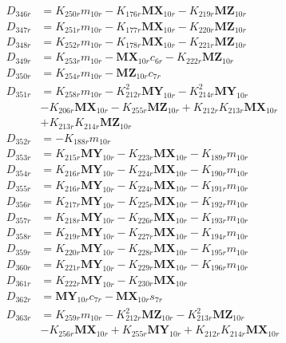 \begin{align}
D_{346r} &= K_{250r}m_{10r} - K_{176r}\mathbf{MX}_{10r} - K_{219r}\mathbf{MZ}_{10r} \nonumber \\
D_{347r} &= K_{251r}m_{10r} - K_{177r}\mathbf{MX}_{10r} - K_{220r}\mathbf{MZ}_{10r} \nonumber \\
D_{348r} &= K_{252r}m_{10r} - K_{178r}\mathbf{MX}_{10r} - K_{221r}\mathbf{MZ}_{10r} \nonumber \\
D_{349r} &= K_{253r}m_{10r} - \mathbf{MX}_{10r}c_{6r} - K_{222r}\mathbf{MZ}_{10r} \nonumber \\
D_{350r} &= K_{254r}m_{10r} - \mathbf{MZ}_{10r}c_{7r} \nonumber \\
D_{351r} &= K_{258r}m_{10r} - K_{212r}^2\mathbf{MY}_{10r} - K_{214r}^2\mathbf{MY}_{10r}  \nonumber \\
&- K_{206r}\mathbf{MX}_{10r} - K_{255r}\mathbf{MZ}_{10r} + K_{212r}K_{213r}\mathbf{MX}_{10r}  \nonumber \\
&+ K_{213r}K_{214r}\mathbf{MZ}_{10r} \nonumber \\
D_{352r} &= -K_{188r}m_{10r} \nonumber \\
D_{353r} &= K_{215r}\mathbf{MY}_{10r} - K_{223r}\mathbf{MX}_{10r} - K_{189r}m_{10r} \nonumber \\
D_{354r} &= K_{216r}\mathbf{MY}_{10r} - K_{224r}\mathbf{MX}_{10r} - K_{190r}m_{10r} \nonumber \\
D_{355r} &= K_{216r}\mathbf{MY}_{10r} - K_{224r}\mathbf{MX}_{10r} - K_{191r}m_{10r} \nonumber \\
D_{356r} &= K_{217r}\mathbf{MY}_{10r} - K_{225r}\mathbf{MX}_{10r} - K_{192r}m_{10r} \nonumber \\
D_{357r} &= K_{218r}\mathbf{MY}_{10r} - K_{226r}\mathbf{MX}_{10r} - K_{193r}m_{10r} \nonumber \\
D_{358r} &= K_{219r}\mathbf{MY}_{10r} - K_{227r}\mathbf{MX}_{10r} - K_{194r}m_{10r} \nonumber \\
D_{359r} &= K_{220r}\mathbf{MY}_{10r} - K_{228r}\mathbf{MX}_{10r} - K_{195r}m_{10r} \nonumber \\
D_{360r} &= K_{221r}\mathbf{MY}_{10r} - K_{229r}\mathbf{MX}_{10r} - K_{196r}m_{10r} \nonumber \\
D_{361r} &= K_{222r}\mathbf{MY}_{10r} - K_{230r}\mathbf{MX}_{10r} \nonumber \\
D_{362r} &= \mathbf{MY}_{10r}c_{7r} - \mathbf{MX}_{10r}s_{7r} \nonumber \\
D_{363r} &= K_{259r}m_{10r} - K_{212r}^2\mathbf{MZ}_{10r} - K_{213r}^2\mathbf{MZ}_{10r}  \nonumber \\
&- K_{256r}\mathbf{MX}_{10r} + K_{255r}\mathbf{MY}_{10r} + K_{212r}K_{214r}\mathbf{MX}_{10r}  \nonumber \\

\end{align}
